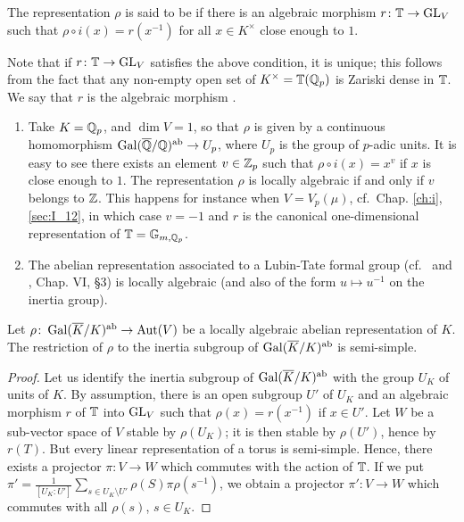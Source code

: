 \begin{mydef}
The representation $\rho$ is said to be  if there is
an algebraic morphism $r \colon \mathbb{T} \to \operatorname{GL}_V$ such that $\rho \circ i(x) =
r(x^{-1})$ for all $x \in K^\times$ close enough to $1$. 
\end{mydef}

Note that if $r \colon \mathbb{T} \to \operatorname{GL}_V$ satisfies the above condition, it is
unique; this follows from the fact that any non-empty open set of $K^\times =
\mathbb{T}(\mathbb{Q}_p)$ is Zariski dense in $\mathbb{T}$. We say that $r$ is the algebraic morphism
.

\begin{ex}
\begin{enumerate}
\item Take $K = \mathbb{Q}_p$, and $\dim V = 1$, so that $\rho$ is given by a
	continuous homomorphism $\operatorname{Gal}(\overline{\mathbb{Q}}/\mathbb{Q})^{\mathrm{ab}} \to U_p$, where
	$U_p$ is the group of $p$-adic units. It is easy to see there exists an
	element $v \in \mathbb{Z}_p$ such that $\rho \circ i (x) = x^v$ if $x$ is close
	enough to $1$. The representation $\rho$ is locally algebraic if and
	only if $v$ belongs to $\mathbb{Z}$.  This happens for instance when $V =
	V_p(\mu)$, cf.\ Chap. \ref{ch:i}, \ref{sec:I_12}, in which case $v = -1$
	and $r$ is the canonical one-dimensional representation of $\mathbb{T} =
	\mathbb{G}_{m, \mathbb{Q}_p}$. 
\item The abelian representation associated to a Lubin-Tate formal group
	\dpage
	(cf.\ \cite{17} and \cite{6}, Chap. VI, \S 3) is locally algebraic (and
	also of the form $u \mapsto u^{-1}$ on the inertia group).  
\end{enumerate}
\end{ex}

\begin{prop}
	Let $\rho \colon \operatorname{Gal}(\overline{K}/K)^{\mathrm{ab}} \to \operatorname{Aut}(V)$ be a locally
	algebraic abelian representation of $K$. The restriction of $\rho$ to
	the inertia subgroup of $\operatorname{Gal}(\overline{K}/K)^{\mathrm{ab}}$ is semi-simple.
\end{prop}
\begin{proof}
Let us identify the inertia subgroup of $\operatorname{Gal}(\overline{K}/K)^{\mathrm{ab}}$ with the
group $U_K$ of units of $K$.
By assumption, there is an open subgroup $U'$ of $U_K$ and an algebraic morphism
$r$ of $\mathbb{T}$ into $\operatorname{GL}_V$ such that $\rho(x) = r (x^{-1})$ if $x \in U'$.
Let $W$ be a sub-vector space of $V$ stable by $\rho(U_K)$; it is then stable by
$\rho(U')$, hence by $r(T)$. But every linear representation of a torus is
semi-simple. Hence, there exists a projector $\pi \colon V \to W$ which commutes
with the action of $\mathbb{T}$. If we put $\pi' = \frac{1}{[U_K:U']}\sum_{s \in U_K
\setminus U'} \rho(S) \pi \rho(s^{-1})$,
we obtain a projector $\pi' \colon V \to W$ which commutes with all $\rho(s)$,
$s \in U_K$. 
\end{proof}

